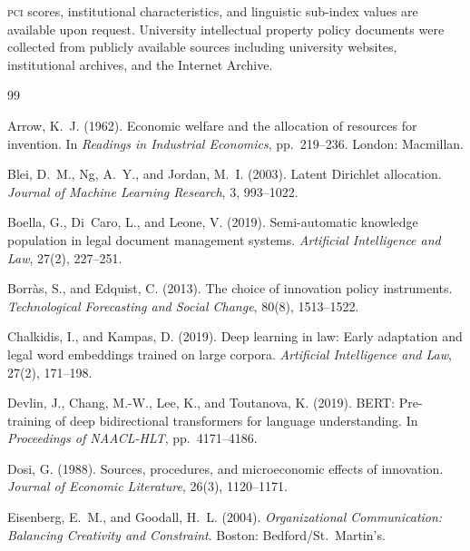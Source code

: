 \documentclass[12pt]{article}
\newcommand{\PCI}{\textsc{pci}}
\begin{document}
\PCI{} scores, institutional characteristics, and linguistic sub-index values are
available upon request.  University intellectual property policy documents were
collected from publicly available sources including university websites, institutional
archives, and the Internet Archive.  
\newpage

\begin{thebibliography}{99}

Arrow, K.~J. (1962).
\newblock Economic welfare and the allocation of resources for invention.
\newblock In \textit{Readings in Industrial Economics}, pp.~219--236.
  London: Macmillan.

Blei, D.~M., Ng, A.~Y., and Jordan, M.~I. (2003).
\newblock Latent Dirichlet allocation.
\newblock \textit{Journal of Machine Learning Research}, 3, 993--1022.

Boella, G., Di~Caro, L., and Leone, V. (2019).
\newblock Semi-automatic knowledge population in legal document management systems.
\newblock \textit{Artificial Intelligence and Law}, 27(2), 227--251.

Borr\`as, S., and Edquist, C. (2013).
\newblock The choice of innovation policy instruments.
\newblock \textit{Technological Forecasting and Social Change}, 80(8), 1513--1522.

Chalkidis, I., and Kampas, D. (2019).
\newblock Deep learning in law: Early adaptation and legal word embeddings trained
  on large corpora.
\newblock \textit{Artificial Intelligence and Law}, 27(2), 171--198.

Devlin, J., Chang, M.-W., Lee, K., and Toutanova, K. (2019).
\newblock BERT: Pre-training of deep bidirectional transformers for language
  understanding.
\newblock In \textit{Proceedings of NAACL-HLT}, pp.~4171--4186.

Dosi, G. (1988).
\newblock Sources, procedures, and microeconomic effects of innovation.
\newblock \textit{Journal of Economic Literature}, 26(3), 1120--1171.

Eisenberg, E.~M., and Goodall, H.~L. (2004).
\newblock \textit{Organizational Communication: Balancing Creativity and
  Constraint}.
\newblock Boston: Bedford/St.~Martin's.


\end{thebibliography}
\end{document}
